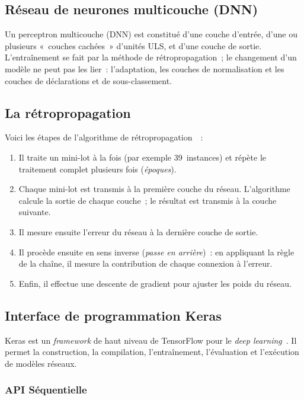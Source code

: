 \documentclass[a4paper,12pt,twoside]{report}
\theoremstyle{definition}
\theoremstyle{plain}
\theoremstyle{remark}
\begin{document}
\subsection{Réseau de neurones multicouche (DNN)}
\label{subsec:dnn}

Un perceptron multicouche (\ac{DNN}) est constitué d'une couche d'entrée, d'une ou plusieurs
«~couches cachées~» d'unités ULS, et d'une couche de sortie. L'entraînement se fait par la
méthode de rétropropagation~; le changement d'un modèle ne peut pas les lier~: l'adaptation,
les couches de normalisation et les couches de déclarations et de sous-classement.

\subsection{La rétropropagation}
\label{subsec:backprop}

Voici les étapes de l'algorithme de rétropropagation~\cite{geron2023deeplearning}~:
\begin{enumerate}
	\item Il traite un mini-lot à la fois (par exemple 39~instances) et répète le traitement
	      complet plusieurs fois (\textit{époques}).
	\item Chaque mini-lot est transmis à la première couche du réseau. L'algorithme calcule
	      la sortie de chaque couche~; le résultat est transmis à la couche suivante.
	\item Il mesure ensuite l'erreur du réseau à la dernière couche de sortie.
	\item Il procède ensuite en sens inverse (\textit{passe en arrière})~: en appliquant la
	      règle de la chaîne, il mesure la contribution de chaque connexion à l'erreur.
	\item Enfin, il effectue une descente de gradient pour ajuster les poids du réseau.
\end{enumerate}

\subsection{Interface de programmation Keras}
\label{subsec:keras}

Keras est un \textit{framework} de haut niveau de TensorFlow pour le
\textit{deep learning}~\cite{geron2023deeplearning}. Il permet la construction, la
compilation, l'entraînement, l'évaluation et l'exécution de modèles réseaux.

\subsubsection*{API Séquentielle}
\end{document}
